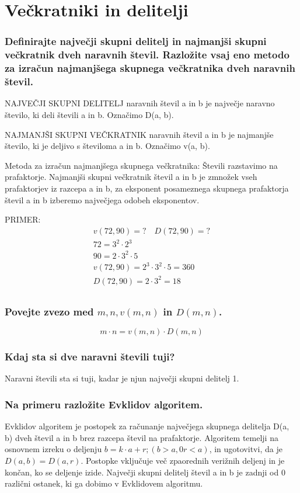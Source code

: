 \documentclass{article}
\begin{document}
\section{Večkratniki in delitelji}
\subsubsection*{Definirajte največji skupni delitelj in najmanjši skupni večkratnik dveh naravnih števil. Razložite vsaj eno metodo za izračun najmanjšega skupnega večkratnika dveh naravnih števil.}

NAJVEČJI SKUPNI DELITELJ naravnih števil a in b je največje naravno število, ki deli števili a in b. Označimo D(a, b).

NAJMANJŠI SKUPNI VEČKRATNIK naravnih števil a in b je najmanjše število, ki je deljivo s številoma a in b. Označimo v(a, b).



Metoda za izračun najmanjšega skupnega večkratnika:
Števili razstavimo na prafaktorje. Najmanjši skupni večkratnik števil a in b je zmnožek vseh prafaktorjev iz razcepa a in b, za eksponent posameznega skupnega prafaktorja števil a in b izberemo največjega odobeh eksponentov.

PRIMER:
\begin{gather*}
    v(72, 90) = ? \quad D(72, 90) = ? \\
    72 = 3^2 \cdot 2^3 \\
    90 = 2 \cdot 3^2 \cdot 5 \\
    v(72, 90) = 2^3 \cdot 3^2 \cdot 5 = 360 \\
    D(72, 90) = 2 \cdot 3^2 = 18 \\
\end{gather*}

\subsubsection*{Povejte zvezo med $m, n, v(m, n)$ in $D(m, n)$.}
\begin{equation*}
    m \cdot n = v(m, n) \cdot D(m, n)
\end{equation*}


\subsubsection*{Kdaj sta si dve naravni števili tuji?}
Naravni števili sta si tuji, kadar je njun največji skupni delitelj 1.


\subsubsection*{Na primeru razložite Evklidov algoritem.}
Evklidov algoritem je postopek za računanje največjega skupnega delitelja D(a, b) dveh števil a in b brez razcepa števil na prafaktorje. Algoritem temelji na osnovnem izreku o deljenju
$b = k \cdot a + r; (b > a, 0 r < a)$, in ugotovitvi, da je $D(a, b) = D(a, r)$. Postopke vključuje več zpaorednih verižnih deljenj in je končan, ko se deljenje izide.
Največji skupni delitelj števil a in b je zadnji od 0 različni ostanek, ki ga dobimo v Evklidovem algoritmu.
\end{document}
